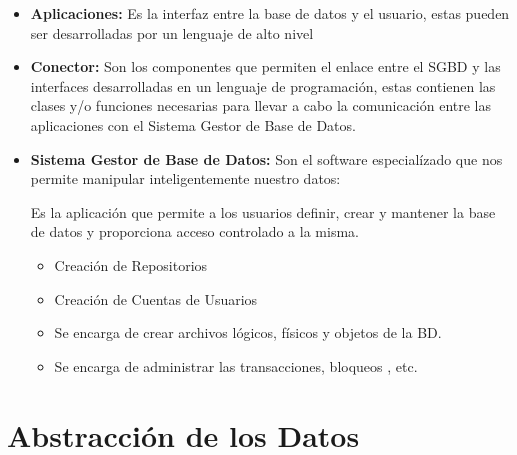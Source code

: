 \documentclass[12pt, fleqn]{report}                             %
\theoremstyle{break}                                            %
\begin{document}
            \begin{itemize}
                \item
                    \textbf{Aplicaciones:} Es la interfaz entre la base de datos y el usuario, estas pueden
                    ser desarrolladas por un lenguaje de alto nivel 

                \item
                    \textbf{Conector:} Son los componentes que permiten el enlace entre el SGBD y las
                    interfaces desarrolladas en un lenguaje de programación, estas contienen las clases
                    y/o funciones necesarias para llevar a cabo la comunicación entre las aplicaciones
                    con el Sistema Gestor de Base de Datos.

                \item
                    \textbf{Sistema Gestor de Base de Datos:} Son el software especialízado que
                    nos permite manipular inteligentemente nuestro datos:

                    Es la aplicación que permite a los usuarios definir, crear y mantener la base
                    de datos y proporciona acceso controlado a la misma.

                    \begin{itemize}
                        \item Creación de Repositorios
                        \item Creación de Cuentas de Usuarios
                        \item Se encarga de crear archivos lógicos, físicos y objetos de la BD.
                        \item Se encarga de administrar las transacciones, bloqueos , etc.
                    \end{itemize}

            \end{itemize}




        \clearpage
        \section{Abstracción de los Datos}
\end{document}
